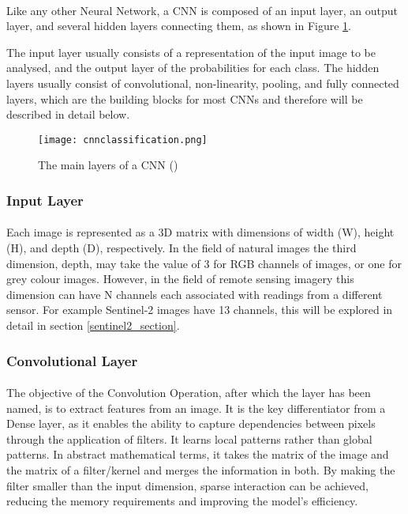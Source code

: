 \paragraph{}
Like any other Neural Network, a \gls{CNN} is composed of an input layer, an output layer, and several hidden layers connecting them, as shown in Figure \ref{fig_cnn_layers}.

The input layer usually consists of a representation of the input image to be analysed, and the output layer of the probabilities for each class.
The hidden layers usually consist of convolutional, non-linearity, pooling, and fully connected layers, which are the building blocks for most \gls{CNN}s and therefore will be described in detail below.

    \begin{figure}[hbt!]
        \centering
        \texttt{[image: cnnclassification.png]}
        \caption{The main layers of a \gls{CNN} (\cite{10.6109/JICCE.2018.16.3.173})}
        \label{fig_cnn_layers}
    \end{figure}

\subsubsection{Input Layer}
\paragraph{}
Each image is represented as a 3D matrix with dimensions of  width (W), height (H), and depth (D), respectively. In the field of natural images the third dimension, depth, may take the value of 3 for \gls{RGB} channels of images, or one for grey colour images. However, in the field of remote sensing imagery this dimension can have N channels each associated with readings from a different sensor. For example Sentinel-2 images have 13 channels, this will be explored in detail in section \ref{sentinel2_section}. 

\subsubsection{Convolutional Layer}
\paragraph{}
The objective of the Convolution Operation, after which the layer has been named, is to extract features from an image. It is the key differentiator from a Dense layer, as it enables the ability to capture dependencies between pixels through the application of filters. It learns local patterns rather than global patterns.
In abstract mathematical terms, it takes the matrix of the image and the matrix of a filter/kernel and merges the information in both. By making the filter smaller than the input dimension, sparse interaction can be achieved, reducing the memory requirements and improving the model's  efficiency.

